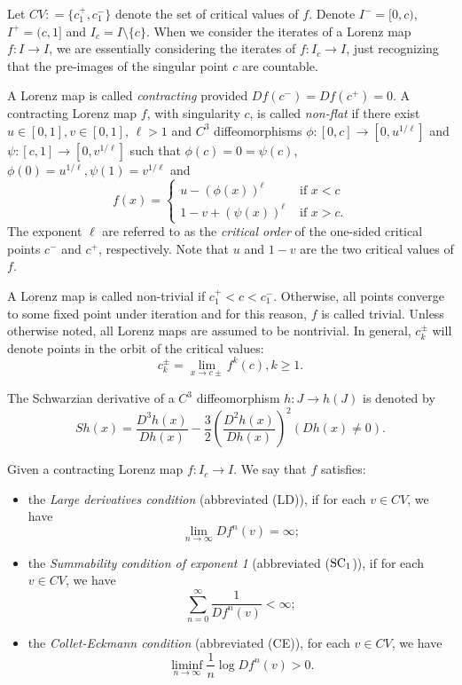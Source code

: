 \documentclass[11pt,oneside]{article}
\theoremstyle{plain}
\numberwithin{equation}{section}
\numberwithin{figure}{section}
\numberwithin{table}{section}
\begin{document}
Let $CV : = \{ c_1^+, c_1^-\}$ denote the set of critical values of $f$. Denote $I^- = [0, c)$, $I^+ = (c, 1]$ and $I_c = I \setminus \{ c\}$. When we consider the iterates of a Lorenz map $f: I \to I$, we are essentially considering the iterates of $f : I_c \to I$, just recognizing that the pre-images of the singular point $c$ are countable.



A Lorenz map is called {\it contracting} provided $Df(c^-) = Df(c^+) =0$. A contracting Lorenz map $f$, with singularity $c$, is called {\it non-flat} if there exist $u \in [0, 1], v \in [0, 1]$, $\ell > 1$ and $C^3$ diffeomorphisms $\phi : [0, c] \to [0, u^{{1}/{\ell}}]$ and $\psi : [c, 1] \to [0, v^{{1}/{\ell}}]$ such that $\phi(c) = 0 =\psi(c)$, $\phi(0) = u^{{1}/{\ell}}, \psi(1) =v^{{1}/{\ell}}$ and 
\begin{equation} f(x) = \begin{cases}
u - (\phi(x))^{\ell} & \mbox{ if } x < c\\
1 - v + (\psi(x))^{\ell} & \mbox{ if } x > c.
\end{cases}
\end{equation}
The exponent $\ell$ are referred to as the {\it critical order} of the one-sided critical points $c^-$ and $c^+ $, respectively. Note that $u$ and $1-v$ are the two critical values of $f$. 


A Lorenz map is called non-trivial if $c_1^+ < c < c_1^-$. Otherwise, all points converge to some fixed point under iteration and for this reason, $f$ is called trivial. Unless otherwise noted, all Lorenz maps are assumed to be nontrivial. In general, $c_k^{\pm}$ will denote points in the orbit of the critical values:
\[
c_k^{\pm} = \lim_{x \to c\pm}f^k(c), k \geq 1.
\] 


The Schwarzian derivative of a $C^3$ diffeomorphism $h : J \to h(J)$ is denoted by
\[ S h (x) = \frac{D^3 h (x)}{D h (x)} - \frac{3}{2} \left( \frac{D^2 h (x)}{D h (x)}\right)^2 ( Dh (x) \neq 0).
\]


Given a contracting Lorenz map $f : I_c  \to I$. We say that $f$ satisfies:
\begin{itemize}
\item[(1)] the {\it Large derivatives condition} (abbreviated (LD)), if for each $v \in CV$, we have
\[
\lim_{n \to \infty} Df^n(v) = \infty;
\]
\item[(2)] the {\it Summability condition of exponent 1} (abbreviated (${\rm SC_1}$)), if for each $v \in CV$, we have
\[
\sum_{n=0}^{\infty} \frac{1}{Df^n(v)} < \infty;
\]
\item[(3)] the {\it Collet-Eckmann condition} (abbreviated (CE)), for each $v \in CV$, we have
\[
\liminf_{n \to \infty} \frac{1}{n} \log D f^n (v) >0.
\]
\end{itemize}
\end{document}
